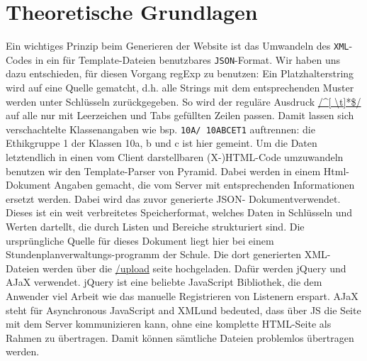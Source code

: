 \chapter{Theoretische Grundlagen}




Ein wichtiges Prinzip beim Generieren der Website ist das Umwandeln des \texttt{XML}-Codes in ein
für Template-Dateien benutzbares \texttt{JSON}-Format. Wir haben uns dazu entschieden, für diesen
Vorgang regExp zu benutzen: Ein Platzhalterstring wird auf eine Quelle gematcht, d.h. alle Strings
mit dem entsprechenden Muster werden unter Schlüsseln zurückgegeben. So wird der reguläre Ausdruck
\url{/^[ \t]*\$/} auf alle nur mit Leerzeichen und Tabs gefüllten Zeilen passen. Damit lassen sich
verschachtelte Klassenangaben wie bsp. \texttt{10A/ 10ABCET1} auftrennen: die Ethikgruppe 1 der
Klassen 10a, b und c ist hier gemeint. Um die Daten letztendlich in einen vom Client darstellbaren
(X-)HTML-Code umzuwandeln benutzen wir den Template-Parser von Pyramid. Dabei werden in einem Html-
Dokument Angaben gemacht, die vom Server mit entsprechenden Informationen ersetzt werden. Dabei wird
das zuvor generierte JSON- Dokumentverwendet. Dieses ist ein weit verbreitetes Speicherformat,
welches Daten in Schlüsseln und Werten dartellt, die durch Listen und Bereiche strukturiert sind.
Die ursprüngliche Quelle für dieses Dokument liegt hier bei einem Stundenplanverwaltungs-programm
der Schule. Die dort generierten XML- Dateien werden über die \url{/upload} seite hochgeladen. Dafür
werden jQuery und AJaX verwendet. jQuery ist eine beliebte JavaScript Bibliothek, die dem Anwender
viel Arbeit wie das manuelle Registrieren von Listenern erspart. AJaX steht für \glqq Asynchronous
JavaScript and XML\grqq und bedeuted, dass über JS die Seite mit dem Server kommunizieren kann, ohne
eine komplette HTML-Seite als Rahmen zu übertragen. Damit können sämtliche Dateien problemlos
übertragen werden.